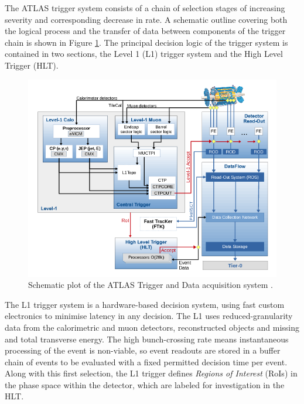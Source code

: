 	The ATLAS trigger system consists of a chain of selection stages of increasing severity and corresponding decrease in rate. A schematic outline covering both the logical process and the transfer of data between components of the trigger chain is shown in Figure \ref{fig:trigschem}. The principal decision logic of the trigger system is contained in two sections, the Level 1 (L1) trigger system and the High Level Trigger (HLT).

	\begin{figure}
		\centering
		\includegraphics[width=0.9\linewidth]{D/FIGS/trigschem}
		\caption[Schematic plot of the ATLAS Trigger and Data acquisition system]{Schematic plot of the ATLAS Trigger and Data acquisition system \cite{trig2015}.}
		\label{fig:trigschem}
		\end{figure}

	The L1 trigger system \cite{L1} is a hardware-based decision system, using fast custom electronics to minimise latency in any decision. The L1 uses reduced-granularity data from the calorimetric and muon detectors, reconstructed objects and missing and total transverse energy. The high bunch-crossing rate means instantaneous processing of the event is non-viable, so event readouts are stored in a buffer chain of events to be evaluated with a fixed permitted decision time per event. Along with this first selection, the L1 trigger defines \textit{Regions of Interest} (RoIs) in the phase space within the detector, which are labeled for investigation in the HLT.

